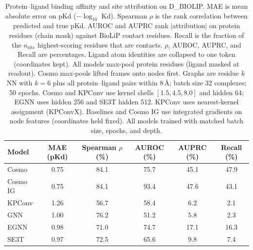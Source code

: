 \begin{table}[t]
\centering
\caption{Protein--ligand binding affinity and site attribution on D\_BIOLIP. MAE is mean absolute error on pKd ($-\log_{10}$ Kd). Spearman $\rho$ is the rank correlation between predicted and true pKd. AUROC and AUPRC rank $|$attribution$|$ on protein residues (chain mask) against BioLiP contact residues. Recall is the fraction of the $n_{\mathrm{site}}$ highest-scoring residues that are contacts. $\rho$, AUROC, AUPRC, and Recall are percentages. Ligand atom identities are collapsed to one token (coordinates kept). All models max-pool protein residues (ligand masked at readout). Cosmo max-pools lifted frames onto nodes first. Graphs are residue $k$NN with $k=6$ plus all protein--ligand pairs within $8$\,\AA{}; batch size 32 complexes; 50 epochs. Cosmo and KPConv use kernel shells $[1.5, 4.5, 8.0]$ and hidden 64; EGNN uses hidden 256 and SE3T hidden 512. KPConv uses nearest-kernel assignment (KPConvX). Baselines and Cosmo IG use integrated gradients on node features (coordinates held fixed). All models trained with matched batch size, epochs, and depth.}
\label{tab:biolip_comparison}
\begin{tabular}{lccccc}
\toprule
Model & MAE (pKd) & Spearman $\rho$ (\%) & AUROC (\%) & AUPRC (\%) & Recall (\%) \\
\midrule
Cosmo & 0.75 & 84.1 & 75.7 & 45.1 & 47.9 \\
Cosmo IG & 0.75 & 84.1 & 93.4 & 47.6 & 43.1 \\
KPConv & 1.26 & 56.7 & 58.4 & 6.2 & 2.1 \\
GNN & 1.00 & 76.2 & 51.2 & 5.8 & 2.3 \\
EGNN & 0.98 & 71.0 & 74.7 & 17.1 & 16.3 \\
SE3T & 0.97 & 72.5 & 65.6 & 9.8 & 7.4 \\
\bottomrule
\end{tabular}
\end{table}
